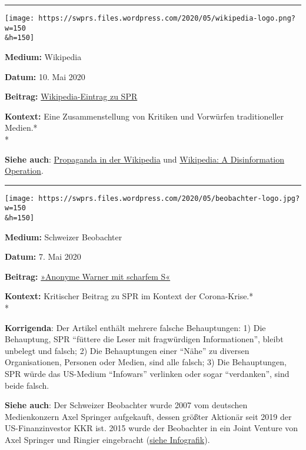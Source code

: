 \begin{center}\rule{0.5\linewidth}{\linethickness}\end{center}

\texttt{[image: https://swprs.files.wordpress.com/2020/05/wikipedia-logo.png?w=150\\\&h=150]}

\textbf{Medium:} Wikipedia

\textbf{Datum:} 10. Mai 2020

\textbf{Beitrag:}
\href{https://de.wikipedia.org/wiki/Swiss_Policy_Research}{Wikipedia-Eintrag
zu SPR}

\textbf{Kontext:} Eine Zusammenstellung von Kritiken und Vorwürfen
traditioneller Medien.*\\
*

\textbf{Siehe auch}:
\href{https://swprs.org/propaganda-in-der-wikipedia/}{Propaganda in der
Wikipedia} und
\href{https://swprs.org/wikipedia-disinformation-operation/}{Wikipedia:
A Disinformation Operation}.

\begin{center}\rule{0.5\linewidth}{\linethickness}\end{center}

\texttt{[image: https://swprs.files.wordpress.com/2020/05/beobachter-logo.jpg?w=150\\\&h=150]}

\textbf{Medium:} Schweizer Beobachter

\textbf{Datum:} 7. Mai 2020

\textbf{Beitrag:}
\href{https://www.beobachter.ch/digital/verschworungstheorien-anonyme-warner-mit-scharfem-s}{»Anonyme
Warner mit scharfem S«}

\textbf{Kontext:} Kritischer Beitrag zu SPR im Kontext der
Corona-Krise.*\\
*

\textbf{Korrigenda}: Der Artikel enthält mehrere falsche Behauptungen:
1) Die Behauptung, SPR ``füttere die Leser mit fragwürdigen
Informationen'', bleibt unbelegt und falsch; 2) Die Behauptungen einer
``Nähe'' zu diversen Organisationen, Personen oder Medien, sind alle
falsch; 3) Die Behauptungen, SPR würde das US-Medium ``Infowars''
verlinken oder sogar ``verdanken'', sind beide falsch.

\textbf{Siehe auch}: Der Schweizer Beobachter wurde 2007 vom deutschen
Medienkonzern Axel Springer aufgekauft, dessen größter Aktionär seit
2019 der US-Finanzinvestor KKR ist. 2015 wurde der Beobachter in ein
Joint Venture von Axel Springer und Ringier eingebracht
(\href{https://swprs.org/netzwerk-medien-schweiz/}{siehe Infografik}).

